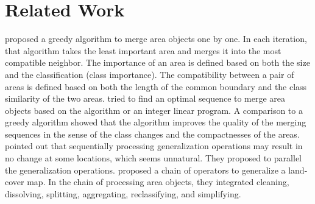 \documentclass[ijgi,article,submit,moreauthors,pdftex]{Definitions/mdpi}
\begin{document}
\section{Related Work}
\label{sec:realted_work}

 proposed a greedy algorithm 
to merge area objects one by one.
In each iteration, that algorithm takes the least important area and 
merges it into the most compatible neighbor.
The importance of an area is defined 
based on both the size and the classification (class importance).
The compatibility between a pair of areas is defined based on 
both the length of the common boundary and the class similarity
of the two areas. 
\citet[]{Peng2019Thesis} tried to find an optimal sequence 
to merge area objects
based on the \Astar algorithm or an integer linear program.
A comparison to a greedy algorithm showed that 
the \Astar algorithm improves the quality of the merging sequences
in the sense of the class changes and the compactnesses of the areas.
 pointed out that 
sequentially processing generalization operations 
may result in no change at some locations, which seems unnatural.
They proposed to parallel the generalization operations.
\citet{Thiemann2018LandCover} proposed a chain of operators 
to generalize a land-cover map.
In the chain of processing area objects, 
they integrated cleaning, dissolving, splitting, aggregating, reclassifying, and simplifying. 
\end{document}
